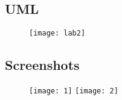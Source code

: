 \subsection{UML}
\begin{figure}[H]
    \texttt{[image: lab2]}
\end{figure}

\subsection{Screenshots}
\begin{figure}[H]
    \texttt{[image: 1]}
    \texttt{[image: 2]}
\end{figure}

